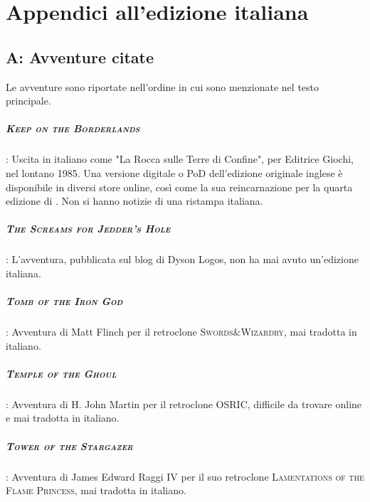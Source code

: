 \chapter{Appendici all'edizione italiana}

\section{A: Avventure citate}\label{appendix:ita:avventure}

Le avventure sono riportate nell'ordine in cui sono menzionate nel testo principale.

\paragraph{\textsc{Keep on the Borderlands}}: Uscita in italiano come "La Rocca sulle Terre di Confine", per Editrice Giochi, nel lontano 1985. Una versione digitale o PoD dell'edizione originale inglese è disponibile in diversi store online, così come la sua reincarnazione per la quarta edizione di \dnd. Non si hanno notizie di una ristampa italiana.

\paragraph{\textsc{The Screams for Jedder's Hole}}: L'avventura, pubblicata sul blog di Dyson Logos, non ha mai avuto un'edizione italiana.

\paragraph{\textsc{Tomb of the Iron God}}: Avventura di Matt Flinch per il retroclone \textsc{Swords\&Wizardry}, mai tradotta in italiano.

\paragraph{\textsc{Temple of the Ghoul}}: Avventura di H. John Martin per il retroclone \textsc{OSRIC}, difficile da trovare online e mai tradotta in italiano.

\paragraph{\textsc{Tower of the Stargazer}}: Avventura di James Edward Raggi IV per il suo retroclone \textsc{Lamentations of the Flame Princess}, mai tradotta in italiano.

